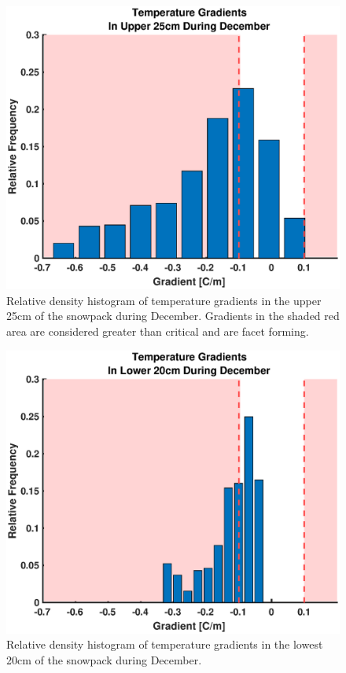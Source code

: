   
  \begin{figure}[H]
    \centering
    \includegraphics[width=0.7\linewidth]{figures/TempGrad/Dec_U25_RDH.eps}
    \caption{Relative density histogram of temperature gradients in the upper 25cm of the snowpack during December. Gradients in the shaded red area are considered greater than critical and are facet forming.}
    \label{fig:Dec_Heatmap}
 \end{figure}
 
  \begin{figure}[H]
    \centering
    \includegraphics[width=0.7\linewidth]{figures/TempGrad/Dec_L20_RDH.eps}
    \caption{Relative density histogram of temperature gradients in the lowest 20cm of the snowpack during December.}
    \label{fig:Dec_L20_RDH}
 \end{figure}
 
